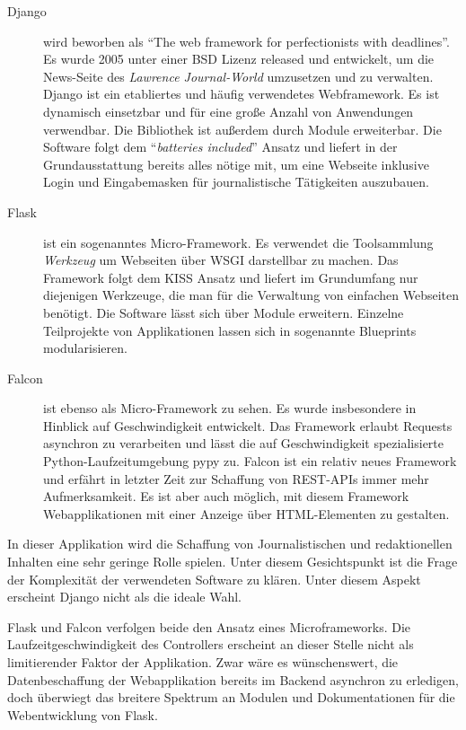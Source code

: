 \begin{description}
 \item [Django] wird beworben als "`The web framework for perfectionists with dead\-lines"'. Es wurde 2005 unter einer BSD Lizenz released und entwickelt, um die News-Seite des \textit{Lawrence Journal-World} umzusetzen und zu verwalten. Django ist ein etabliertes und häufig verwendetes Webframework. Es ist dynamisch einsetzbar und für eine große Anzahl von Anwendungen verwendbar. Die Bibliothek ist außerdem durch Module erweiterbar. Die Software folgt dem "`\textit{batteries included}"' Ansatz und liefert in der Grundausstattung bereits alles nötige mit, um eine Webseite inklusive Login und Eingabemasken für journalistische Tätigkeiten auszubauen.
 
 \item [Flask] ist ein sogenanntes Micro-Framework. Es verwendet die Toolsammlung \textit{Werkzeug} um Webseiten über WSGI darstellbar zu machen. Das Framework folgt dem KISS Ansatz und liefert im Grundumfang nur diejenigen Werkzeuge, die man für die Verwaltung von einfachen Webseiten benötigt. Die Software lässt sich über Module erweitern. Einzelne Teilprojekte von Applikationen lassen sich in sogenannte Blueprints modularisieren. 
 
 \item [Falcon] ist ebenso als Micro-Framework zu sehen. Es wurde insbesondere in Hinblick auf Geschwindigkeit entwickelt. Das Framework erlaubt Requests asynchron zu verarbeiten und lässt die auf Geschwindigkeit spezialisierte Python-Laufzeitumgebung pypy zu. Falcon ist ein relativ neues Framework und erfährt in letzter Zeit zur Schaffung von REST-APIs immer mehr Aufmerksamkeit. Es ist aber auch möglich, mit diesem Framework Webapplikationen mit einer Anzeige über HTML-Elementen zu gestalten. 
\end{description}

In dieser Applikation wird die Schaffung von Journalistischen und redaktionellen Inhalten eine sehr geringe Rolle spielen. Unter diesem Gesichtspunkt ist die Frage der Komplexität der verwendeten Software zu klären. Unter diesem Aspekt erscheint Django nicht als die ideale Wahl.

Flask und Falcon verfolgen beide den Ansatz eines Microframeworks. Die Laufzeitgeschwindigkeit des Controllers erscheint an dieser Stelle nicht als limitierender Faktor der Applikation. Zwar wäre es wünschenswert, die Datenbeschaffung der Webapplikation bereits im Backend asynchron zu erledigen, doch überwiegt das breitere Spektrum an Modulen und Dokumentationen für die Webentwicklung von Flask.

